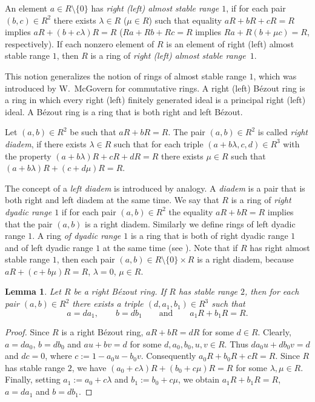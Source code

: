 \documentclass[12pt,a4paper, reqno]{amsart}
\newtheorem{lemma}{Lemma}
\begin{document}
An element  $a\in R\setminus\{0\}$ has  {\it   right (left) almost stable range $1$}, if for each pair $(b,c)\in R^2$  there exists $\lambda\in R$ ($\mu\in R$) such that  equality  $aR+bR+cR=R$  implies   $aR+(b+c\lambda)R=R$ ($Ra+Rb+Rc=R$ implies  $Ra+R(b+\mu c)=R$, respectively). If each nonzero element of $R$ is an element of right (left) almost stable range $1$, then $R$ is a ring of  {\it right (left) almost stable range~$1$}.

This notion generalizes the  notion of rings of almost stable range $1$, which was introduced by W.~McGovern for commutative rings.
 A right (left) B\'ezout ring  is a ring in which every right (left) finitely generated ideal is a principal right (left) ideal.  A B\'ezout ring is a ring that is both right and left B\'ezout.


Let $(a,b)\in R^2$ be such that  $aR+bR=R$. The pair $(a,b)\in R^2$ is called   {\it right diadem}, \linebreak
if there  exists  $\lambda\in R$ such that for each  triple $(a+b\lambda, c,d)\in R^3$ with the property  \linebreak
$(a+b\lambda)R+cR+dR=R$ there exists  $\mu\in R$ such that
$(a+b\lambda)R+(c+d\mu)R=R$.



The  concept of a {\it  left diadem}  is  introduced by analogy.
A {\it diadem} is a pair that is both right and  left diadem at the same time. We say that $R$ is a ring of {\it right dyadic range $1$} if for each pair $(a,b)\in R^2$ the equality $aR+bR=R$ implies that the pair $(a,b)$ is a right diadem. Similarly we define  rings of left dyadic range $1$. A ring  {\it of dyadic range $1$} is a ring that is both of right dyadic range $1$ and of  left dyadic range $1$ at the same time (see \cite[Definition~2.1 and Definition~2.3]{3-zabavsky}).
Note that if $R$  has  right almost stable range $1$,  then each pair $(a,b)\in R\setminus\{0\}\times R$ is  a right diadem,   because
$aR+(c+b\mu)R=R$, $\lambda=0$, $\mu\in R$.



%
%

\begin{lemma}\label{Lemma:1}
Let $R$ be a right B\'ezout ring.
If\/ $R$  has  stable range $2$,  then for each  pair $(a,b)\in R^2$ there exists  a triple $(d,a_1,b_1)\in R^3$ such that
\[
a=da_1,\qquad  b=db_1 \qquad \text{and}\qquad  a_1R+b_1R=R.
\]
\end{lemma}
\begin{proof}
Since $R$ is a right B\'ezout ring, $aR+bR=dR$ for some $d\in R$. Clearly,   $a=da_0$, \linebreak
$b=db_0$ and $au+bv=d$ for some $d,a_0,b_0,u,v\in R$.
Thus   $da_0u+db_0v=d$ and   $dc=0$, where  \linebreak
$c:=1-a_0u-b_0v$.  Consequently $a_0R+b_0R+cR=R$. Since $R$ has  stable range $2$, we have
$(a_0+c\lambda)R+(b_0+c\mu)R=R$
for some $\lambda,\mu\in R$.
Finally, setting   $a_1:=a_0+c\lambda$ and $b_1:=b_0+c\mu$,  we obtain $a_1R+b_1R=R$,  $a=da_1$ and  $b=db_1$.
\end{proof}
\end{document}
